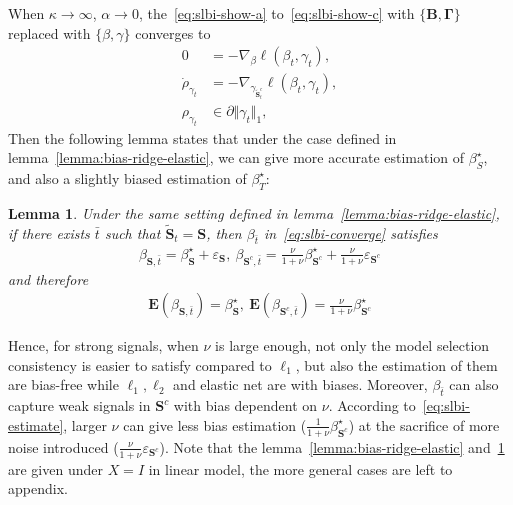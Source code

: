 \documentclass{article}
\newtheorem{lemma}{\textbf{Lemma}}\newtheorem{theorem}{\textbf{Theorem}}\usepackage{algorithmic}
\begin{document}
When $\kappa\to\infty$, $\alpha\to0$, the~\ref{eq:slbi-show-a} to~\ref{eq:slbi-show-c} with $\{\mathbf{B},\mathbf{\Gamma}\}$
replaced with $\{\beta,\gamma\}$ converges to 
 \begin{subequations}
\label{eq:slbi-converge}
\begin{align}
0 & =-\nabla_{\beta}\ell(\beta_{t},\gamma_{t}),\label{eq:slbi-converge-a}\\
\dot{\rho}_{\gamma_{t}} & =-\nabla_{\gamma_{\widetilde{\mathbf{S}}_{t}^{c}}}\ell(\beta_{t},\gamma_{t}),\label{eq:slbi-converge-b}\\
\rho_{\gamma_{t}} & \in\partial\Vert\gamma_{t}\Vert_{1},\label{eq:slbi-converge-c}
\end{align}
\end{subequations} Then the following lemma states that under the
case defined in lemma~\ref{lemma:bias-ridge-elastic}, we can give
more accurate estimation of $\beta_{S}^{\star}$, and also a slightly
biased estimation of $\beta_{T}^{\star}$:\\
 \begin{lemma} Under the same setting defined in lemma~\ref{lemma:bias-ridge-elastic},
if there exists $\bar{t}$ such that $\widetilde{\mathbf{S}}_{t}=\mathbf{S}$,
then $\beta_{\bar{t}}$ in~\ref{eq:slbi-converge} satisfies
\begin{align}
\beta_{\mathbf{S},\bar{t}}=\beta_{\mathbf{S}}^{\star}+\varepsilon_{\mathbf{S}},\ \beta_{\mathbf{S}^{c},\bar{t}}=\frac{\nu}{1+\nu}\beta_{\mathbf{S}^{c}}^{\star}+\frac{\nu}{1+\nu}\varepsilon_{\mathbf{S}^{c}}\label{eq:slbi-estimate}
\end{align}
and therefore
\begin{align}
\mathbf{E}(\beta_{\mathbf{S},\bar{t}})=\beta_{\mathbf{S}}^{\star},\ \mathbf{E}(\beta_{\mathbf{S}^{c},\bar{t}})=\frac{\nu}{1+\nu}\beta_{\mathbf{S}^{c}}^{\star}\label{eq:slbi-estimate-expect}
\end{align}
\label{lemma:slbi} \end{lemma} Hence, for strong signals, when $\nu$
is large enough, not only the model selection consistency is easier to satisfy compared to $\ell_{1}$, but also the estimation of
them are bias-free while $\ell_{1},\ell_{2}$ and elastic net are
with biases. Moreover, $\beta_{\bar{t}}$ can also capture weak signals
in $\mathbf{S}^{c}$ with bias dependent on $\nu$. According to~\ref{eq:slbi-estimate},
larger $\nu$ can give less bias estimation ($\frac{1}{1+\nu}\beta_{\mathbf{S}^{c}}^{\star}$)
at the sacrifice of more noise introduced ($\frac{\nu}{1+\nu}\varepsilon_{\mathbf{S}^{c}}$).
Note that the lemma~\ref{lemma:bias-ridge-elastic} and~\ref{lemma:slbi}
are given under $X=I$ in linear model, the more general cases are
left to appendix.
\end{document}
